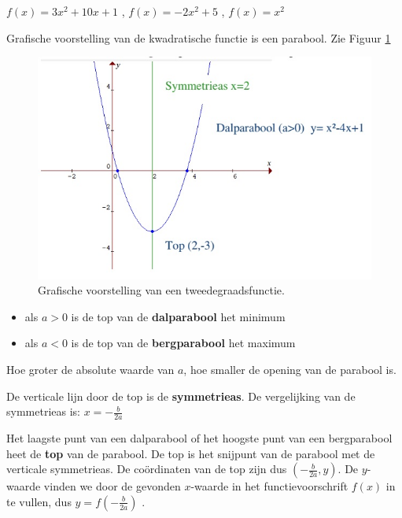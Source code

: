 \begin{voorbeeld}
	$f(x)=3x^{2}+10x+1$ , $f(x)=-2x^{2}+5$
, $f(x)=x^{2}$
\end{voorbeeld}

Grafische voorstelling van de kwadratische functie
is een parabool.
Zie Figuur \ref{fig:tweede}
\begin{figure}[h]
\centering{}\includegraphics[width=.7\linewidth]{2_elem_rekenvaardigheden_B/inputs/tweedegraadsfuncties1.jpg}
\caption{Grafische voorstelling van een tweedegraadsfunctie.}
\label{fig:tweede} 
\end{figure}

\begin{itemize}
\item als $a>0$ is de top van de \textbf{dalparabool} het minimum
\item als $a<0$ is de top van de \textbf{bergparabool} het maximum
\end{itemize}
Hoe groter de absolute waarde van $a$, hoe smaller de opening
van de parabool is.

De verticale lijn door de top is de \textbf{symmetrieas}.
De vergelijking van de symmetrieas is: $x=-\frac{b}{2a}$ 

Het laagste punt van een dalparabool of het hoogste punt
van een bergparabool heet de \textbf{top} van de parabool. De top
is het snijpunt van de parabool met de verticale symmetrieas. De co\"ordinaten
van de top zijn dus $(-\frac{b}{2a},y)$. De $y$-waarde vinden we
door de gevonden $x$-waarde in het functievoorschrift $f(x)$ in
te vullen, dus $y=f(-\frac{b}{2a})$ .


